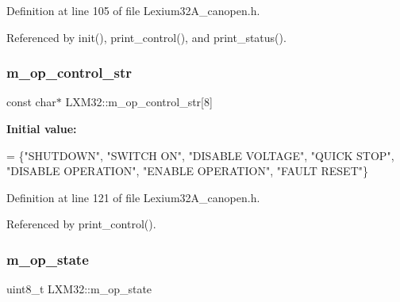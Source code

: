 Definition at line 105 of file Lexium32\+A\+\_\+canopen.\+h.



Referenced by init(), print\+\_\+control(), and print\+\_\+status().

\mbox{\label{class_l_x_m32_a4659d2f6a3aca334e9ecc5cabd471c7c}} 
\subsubsection{\texorpdfstring{m\+\_\+op\+\_\+control\+\_\+str}{m\_op\_control\_str}}
{\footnotesize\ttfamily const char$\ast$ L\+X\+M32\+::m\+\_\+op\+\_\+control\+\_\+str\mbox{[}8\mbox{]}\hspace{0.3cm}{\ttfamily [private]}}

{\bfseries Initial value\+:}
\begin{DoxyCode}
= \{\textcolor{stringliteral}{"SHUTDOWN"},          \textcolor{stringliteral}{"SWITCH ON"},
                                       \textcolor{stringliteral}{"DISABLE VOLTAGE"},   \textcolor{stringliteral}{"QUICK STOP"},
                                       \textcolor{stringliteral}{"DISABLE OPERATION"}, \textcolor{stringliteral}{"ENABLE OPERATION"},
                                       \textcolor{stringliteral}{"FAULT RESET"}\}
\end{DoxyCode}


Definition at line 121 of file Lexium32\+A\+\_\+canopen.\+h.



Referenced by print\+\_\+control().

\mbox{\label{class_l_x_m32_af04b03864c14875f6f71818bfe3e159d}} 
\subsubsection{\texorpdfstring{m\+\_\+op\+\_\+state}{m\_op\_state}}
{\footnotesize\ttfamily uint8\+\_\+t L\+X\+M32\+::m\+\_\+op\+\_\+state\hspace{0.3cm}{\ttfamily [private]}}



